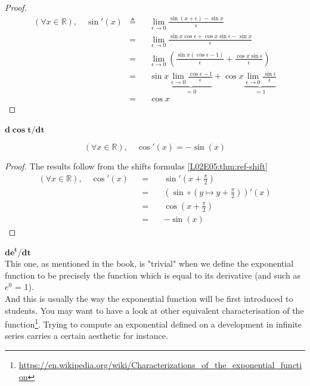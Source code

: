 \documentclass[solutions.tex]{subfiles}
\renewcommand{\bm}[1]{\pmb{#1}}
\begin{document}
\begin{proof}
\begin{equation*} \begin{aligned}
	(\forall x \in\mathbb{R}),\quad\sin'(x) &\triangleq&& \lim_{\epsilon \rightarrow 0}
		\frac{\sin(x+\epsilon)-\sin x}{\epsilon} \\
	~ &=&& \lim_{\epsilon \rightarrow 0}
		\frac{\sin x\cos\epsilon+\cos x\sin\epsilon-\sin x}{\epsilon} \\
	~ &=&& \lim_{\epsilon \rightarrow 0}\left(
		\frac{\sin x(\cos\epsilon-1)}{\epsilon}+\frac{\cos x\sin\epsilon}{\epsilon}
		\right) \\
	~ &=&& \sin x\underbrace{
			\lim_{\epsilon \rightarrow 0}\frac{\cos\epsilon-1}{\epsilon}
		}_{=0}
		+\cos x\underbrace{
			\lim_{\epsilon\rightarrow 0}\frac{\sin\epsilon}{\epsilon}
		}_{=1} \\
	~ &=&& \boxed{\cos x}
\end{aligned} \end{equation*}
\end{proof}
\hr
$\bm{d\cos t/dt}$\,\\
\begin{theorem}
\[
	(\forall x\in\mathbb{R}),\quad \boxed{\cos'(x) = -\sin(x)}
\]
\end{theorem}
\begin{proof}
The results follow from the shifts formulas \ref{L02E05:thm:ref-shift}
\begin{equation*} \begin{aligned}
	(\forall x\in\mathbb{R}),\quad \cos'(x) &&=\quad&
		\sin'(x+\frac\pi2) \\
	~ &&=\quad& (\sin\circ(y \mapsto y+\frac\pi2))'(x) \\
	~ &&=\quad& \cos(x+\frac\pi2) \\
	~ &&=\quad& \boxed{-\sin(x)}
\end{aligned} \end{equation*}
\end{proof}

\hr
$\bm{d e^t/dt}$\,\\
This one, as mentioned in the book, is "trivial" when we define the
exponential function to be precisely the function which is equal to
its derivative (and such as $e^0$ = 1). \\

And this is usually the way the exponential function will be first
introduced to students. You may want to have a look at other equivalent
characterisation of the function\footnote
{\url{https://en.wikipedia.org/wiki/Characterizations\_of\_the\_exponential\_function}}.
Trying to compute an exponential defined on a development in infinite
series carries a certain aesthetic for instance.
\end{document}

